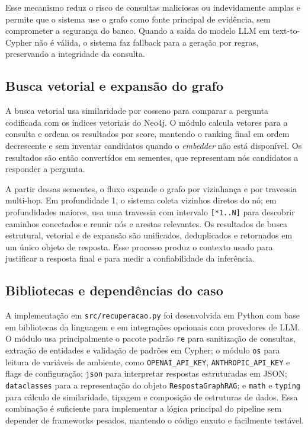 Esse mecanismo reduz o risco de consultas maliciosas ou indevidamente amplas e permite que o sistema use o grafo como fonte principal de evidência, sem comprometer a segurança do banco. Quando a saída do modelo LLM em text-to-Cypher não é válida, o sistema faz fallback para a geração por regras, preservando a integridade da consulta.

\subsection{Busca vetorial e expansão do grafo}

A busca vetorial usa similaridade por cosseno para comparar a pergunta codificada com os índices vetoriais do Neo4j. O módulo calcula vetores para a consulta e ordena os resultados por score, mantendo o ranking final em ordem decrescente e sem inventar candidatos quando o \emph{embedder} não está disponível. Os resultados são então convertidos em sementes, que representam nós candidatos a responder a pergunta.

A partir dessas sementes, o fluxo expande o grafo por vizinhança e por travessia multi-hop. Em profundidade 1, o sistema coleta vizinhos diretos do nó; em profundidades maiores, usa uma travessia com intervalo \texttt{[*1..N]} para descobrir caminhos conectados e reunir nós e arestas relevantes. Os resultados de busca estrutural, vetorial e de expansão são unificados, deduplicados e retornados em um único objeto de resposta. Esse processo produz o contexto usado para justificar a resposta final e para medir a confiabilidade da inferência.

\subsection{Bibliotecas e dependências do caso}

A implementação em \texttt{src/recuperacao.py} foi desenvolvida em Python com base em bibliotecas da linguagem e em integrações opcionais com provedores de LLM. O módulo usa principalmente o pacote padrão \texttt{re} para sanitização de consultas, extração de entidades e validação de padrões em Cypher; o módulo \texttt{os} para leitura de variáveis de ambiente, como \texttt{OPENAI\_API\_KEY}, \texttt{ANTHROPIC\_API\_KEY} e flags de configuração; \texttt{json} para interpretar respostas estruturadas em JSON; \texttt{dataclasses} para a representação do objeto \texttt{RespostaGraphRAG}; e \texttt{math} e \texttt{typing} para cálculo de similaridade, tipagem e composição de estruturas de dados. Essa combinação é suficiente para implementar a lógica principal do pipeline sem depender de frameworks pesados, mantendo o código enxuto e facilmente testável.

